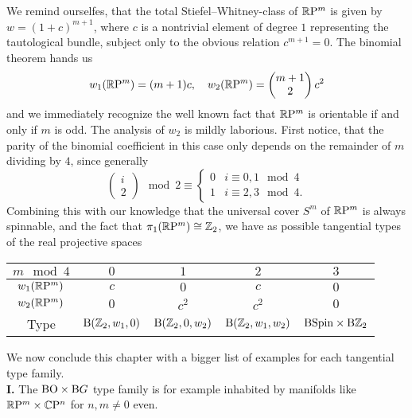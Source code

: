 We remind ourselfes, that the total Stiefel--Whitney-class of $\mathbb{R}\mathrm{P}^m$ is given by $w= (1+c)^{m+1}$, where $c$ is a nontrivial element of degree $1$ representing the tautological bundle, subject only to the obvious relation $c^{m+1} = 0$.
The binomial theorem hands us
\begin{equation*}
    w_1(\mathbb{R}\mathrm{P}^m) = (m+1)c,\quad w_2(\mathbb{R}\mathrm{P}^m) = \begin{pmatrix} m+1 \\ 2 \end{pmatrix}c^2
\end{equation*}
and we immediately recognize the well known fact that $\mathbb{R}\mathrm{P}^m$ is orientable if and only if $m$ is odd.
The analysis of $w_2$ is mildly laborious.
First notice, that the parity of the binomial coefficient in this case only depends on the remainder of $m$ dividing by $4$, since generally 
\begin{equation*}\tag{$\diamondsuit$}
    \begin{pmatrix} i\\2 \end{pmatrix} \mod 2 \equiv \begin{cases} 0 & i \equiv 0,1 \mod 4 \\ 1 & i\equiv 2,3 \mod 4.\end{cases}
\end{equation*}
Combining this with our knowledge that the universal cover $S^m$ of $\mathbb{R}\mathrm{P}^m$ is always spinnable, and the fact that $\pi_1(\mathbb{R}\mathrm{P}^m) \cong \mathbb{Z}_2$, we have as possible tangential types of the real projective spaces
\begin{center}\vspace{.5\baselineskip}
    \begin{tabular}{c|c|c|c|c}\hline\hline
        $m \mod 4$ & $0$ & $1$ & $2$ & $3$\\\hline
        $w_1(\mathbb{R}\mathrm{P}^m) $ & $c$ & $0$ & $c$ & $0$\\
        $w_2(\mathbb{R}\mathrm{P}^m) $ & $0$ & $c^2$ & $c^2$ & $0$\\
        Type & $\mathrm{B}(\mathbb{Z}_2,w_1,0)$ & $\mathrm{B}(\mathbb{Z}_2,0,w_2)$ & $\mathrm{B}(\mathbb{Z}_2,w_1,w_2)$ & $\mathrm{BSpin}\times\mathrm{B}\mathbb{Z}_2$ \\\hline\hline
    \end{tabular}\vspace{.5\baselineskip}
\end{center}
We now conclude this chapter with a bigger list of examples for each tangential type family.\\
 \textbf{I.} The $\mathrm{BO}\times\mathrm{B} G$ type family is for example inhabited by manifolds like $\mathbb{R}\mathrm{P}^m\times\mathbb{C}\mathrm{P}^n$ for $n,m\neq 0$ even.
